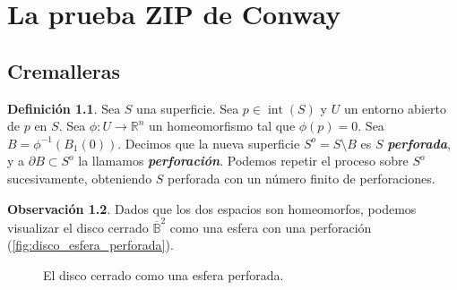 \documentclass[10pt]{report}
\newcommand{\R}{\mathbb{R}}
\DeclareMathOperator{\interior}{int} %
\newcommand{\enfatiza}[1]{\textbf{\textit{#1}}}
\theoremstyle{definition}
\newtheorem{defin}{Definición}[section]
\newtheorem{obs}[defin]{Observación}
\begin{document}
\chapter{La prueba ZIP de Conway}

\section{Cremalleras}

\begin{defin}%
\label{def:perforacion}
Sea $S$ una superficie. Sea $p\in \interior (S)$ y $U$ un entorno abierto de $p$ en $S$. Sea $\phi :U\to \R^n$ un homeomorfismo tal que $\phi (p)=0$. Sea $B=\phi ^{-1}(B_1(0))$. Decimos que la nueva superficie $S^o=S\setminus B$ es $S$ \enfatiza{perforada}, y a $\partial B\subset S^o$ la llamamos \enfatiza{perforación}. Podemos repetir el proceso sobre $S^o$ sucesivamente, obteniendo $S$ perforada con un número finito de perforaciones.
\end{defin}

\begin{obs}%
Dados que los dos espacios son homeomorfos, podemos visualizar el disco cerrado $\overline{\mathbb{B}}^2$ como una esfera con una perforación (\autoref{fig:disco_esfera_perforada}).
\end{obs}
 

\begin{figure}[h]%
\centering
{}
\caption{El disco cerrado como una esfera perforada.\label{fig:disco_esfera_perforada}}
\end{figure}
\end{document}
